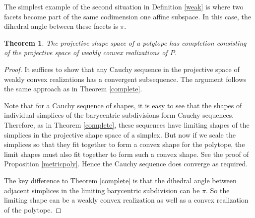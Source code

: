 \documentclass[a4paper, 12pt]{amsart}
\theoremstyle{plain}
\newtheorem{Thm}{Theorem}
\begin{document}
The simplest example of the second situation in Definition \ref{weak} is where two facets become part of the same codimension one affine subspace. In this case, the dihedral angle between these facets is $\pi$. 

\begin{Thm}
The projective shape space of a polytope has completion consisting of the projective space of weakly convex realizations of $P$. 

\end{Thm}
    
    
    \begin{proof}
    
    It suffices to show that any Cauchy sequence in the projective space of weakly convex realizations has a convergent subsequence. The argument follows the same approach as in Theorem \ref{complete}. 
    
    Note that for a Cauchy sequence of shapes, it is easy to see that the shapes of individual simplices of the barycentric subdivisions form Cauchy sequences. Therefore, as in Theorem \ref{complete}, these sequences have limiting shapes of the simplices in the projective shape space of a simplex. But now if we scale the simplices so that they fit together to form a convex shape for the polytope, the limit shapes must also fit together to form such a convex shape. See the proof of Proposition \ref{metricpoly}. Hence the Cauchy sequence does converge as required. 

    The key difference to Theorem \ref{complete} is that the dihedral angle between adjacent simplices in the limiting barycentric subdivision can be $\pi$. So the limiting shape can be a weakly convex realization as well as a convex realization of the polytope. 
    
    
    \end{proof}
  






\end{document}

